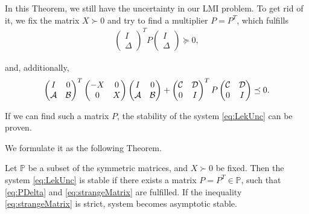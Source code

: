 In this Theorem, we still have the uncertainty in our LMI problem. 
To get rid of it, we fix the matrix $X\succ 0$ and try to find a multiplier $P = P^T$, which fulfills 
\begin{align}
	\label{eq:PDelta}
	\begin{pmatrix}
		I \\ \Delta
	\end{pmatrix}^T 
	P
	\begin{pmatrix}
		I \\ \Delta
	\end{pmatrix} \succeq 0,
\end{align}

and, additionally,
	\begin{align}
	\label{eq:strangeMatrix}
	\begin{pmatrix}
		I & 0 \\ \mathcal{A} &  \mathcal{B}
	\end{pmatrix}^T\begin{pmatrix}
		-X & 0 \\ 0 & X
	\end{pmatrix} 
	\begin{pmatrix}
		I & 0 \\ \mathcal{A} &  \mathcal{B}
	\end{pmatrix} + 
	\begin{pmatrix}
		\mathcal{C} & \mathcal{D} \\ 0 & I
	\end{pmatrix}^T
	P
	\begin{pmatrix}
		\mathcal{C} & \mathcal{D} \\ 0 & I
	\end{pmatrix} \preceq 0.
\end{align}

If we can find such a matrix $P$, the stability of the system \eqref{eq:LekUnc} can be proven. 

We formulate it as the following Theorem. 

\begin{theo}
	\label{thm:stabViaP}
	Let $\mathbb{P}$ be a subset of the symmetric matrices, and $X \succ 0 $ be fixed.
	Then the system \eqref{eq:LekUnc} is stable if there exists a matrix $P = P^T \in \mathbb{P}$, such that \eqref{eq:PDelta} and \eqref{eq:strangeMatrix} are fulfilled. 
	If the inequality \eqref{eq:strangeMatrix} is strict, system becomes asymptotic stable. 
\end{theo}

